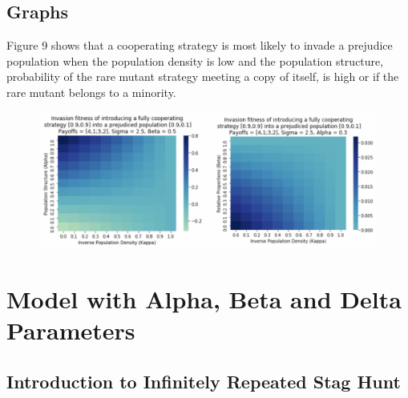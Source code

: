 \documentclass[]{llncs}
\begin{document}
\subsection{Graphs} 

Figure 9 shows that a cooperating strategy is most likely to invade a prejudice population when the population density is low and the population structure, probability of the rare mutant strategy meeting a copy of itself, is high or if the rare mutant belongs to a minority. 

\begin{figure}
\centering
\includegraphics[width=15cm]{images/kappa_graphs}
\caption{ }
\end{figure}


\section{Model with Alpha, Beta and Delta Parameters}

\subsection{Introduction to Infinitely Repeated Stag Hunt}
\end{document}
